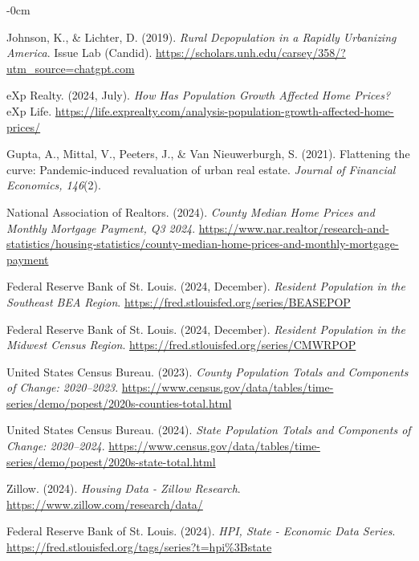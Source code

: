 \documentclass[journal,article,submit,pdftex,moreauthors]{Definitions/mdpi}
\begin{document}
\begin{adjustwidth}{-\extralength}{0cm}
\begin{thebibliography}{99}
Johnson, K., \& Lichter, D. (2019). \textit{Rural Depopulation in a Rapidly Urbanizing America}. Issue Lab (Candid). \url{https://scholars.unh.edu/carsey/358/?utm_source=chatgpt.com} 

eXp Realty. (2024, July). \textit{How Has Population Growth Affected Home Prices?} eXp Life. \url{https://life.exprealty.com/analysis-population-growth-affected-home-prices/}

Gupta, A., Mittal, V., Peeters, J., \& Van Nieuwerburgh, S. (2021). Flattening the curve: Pandemic-induced revaluation of urban real estate. \textit{Journal of Financial Economics, 146}(2). 

National Association of Realtors. (2024). \textit{County Median Home Prices and Monthly Mortgage Payment, Q3 2024}. \url{https://www.nar.realtor/research-and-statistics/housing-statistics/county-median-home-prices-and-monthly-mortgage-payment}

Federal Reserve Bank of St. Louis. (2024, December). \textit{Resident Population in the Southeast BEA Region}. \url{https://fred.stlouisfed.org/series/BEASEPOP}

Federal Reserve Bank of St. Louis. (2024, December). \textit{Resident Population in the Midwest Census Region}. \url{https://fred.stlouisfed.org/series/CMWRPOP}

United States Census Bureau. (2023). \textit{County Population Totals and Components of Change: 2020--2023}. \url{https://www.census.gov/data/tables/time-series/demo/popest/2020s-counties-total.html}

United States Census Bureau. (2024). \textit{State Population Totals and Components of Change: 2020--2024}. \url{https://www.census.gov/data/tables/time-series/demo/popest/2020s-state-total.html}

Zillow. (2024). \textit{Housing Data - Zillow Research}. \url{https://www.zillow.com/research/data/}

Federal Reserve Bank of St. Louis. (2024). \textit{HPI, State - Economic Data Series}. \url{https://fred.stlouisfed.org/tags/series?t=hpi%3Bstate}


\end{thebibliography}
\end{adjustwidth}
\end{document}
